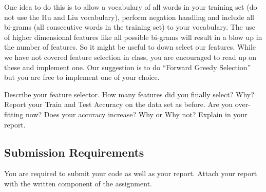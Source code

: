 One idea to do this is to allow a vocabulary of all words in your training set (do not use the Hu and Liu vocabulary), perform negation handling and include all bi-grams (all consecutive words in the training set) to your vocabulary. The use of higher dimensional features like all possible bi-grams will result in a blow up in the number of features. So it might be useful to down select our features. While we have not covered feature selection in class, you are encouraged to read up on these and implement one. Our suggestion is to do ``Forward Greedy Selection'' but you are free to implement one of your choice.

Describe your feature selector. How many features did you finally select? Why? Report your Train and Test Accuracy on the data set as before. Are you over-fitting now? Does your accuracy increase? Why or Why not? Explain in your report.

\subsection{Submission Requirements}
You are required to submit your code as well as your report. Attach your report with the written component of the assignment. 